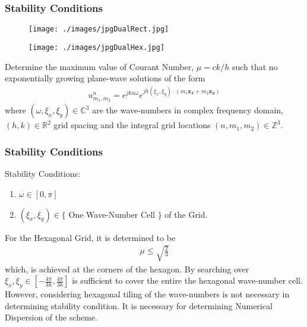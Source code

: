 \documentclass{beamer}
\begin{document}
\begin{frame}
\frametitle{Stability Conditions}
\begin{figure}
\centering
\begin{minipage}{.5\textwidth}
  \centering
\texttt{[image: ./images/jpgDualRect.jpg]}
\label{fig:DualRectGrid}
\end{minipage}%
\begin{minipage}{.5\textwidth}
  \centering
\texttt{[image: ./images/jpgDualHex.jpg]}
\label{fig:DualHexGrid}
\end{minipage}
\end{figure}

Determine the maximum value of Courant Number, $\mu = ck/h$ such that no exponentially growing plane-wave solutions of the form
\begin{align*}
u^{n}_{m_1, m_2} = e^{jk n\omega } e^{jh (\xi_x, \xi_y)\cdot(m_1 \mathbf{x_1}+ m_2 \mathbf{x_2})}
\end{align*}
where $(\omega, \xi_x, \xi_y) \in \mathbb{C}^3$ are the wave-numbers in complex frequency domain, $(h,k) \in  \mathbb{R}^2$ grid spacing and the integral grid locations $(n,m_1,m_2) \in \mathbb{Z}^3$.

\end{frame}

\begin{frame}
\frametitle{Stability Conditions}

Stability Conditions:
\begin{enumerate}
\item $\omega \in [0,\pi]$
\item $(\xi_x, \xi_y) \in \{$ One Wave-Number Cell $\}$ of the Grid. 
\end{enumerate}


For the Hexagonal Grid, it is determined to be 
\begin{align}
\mu \leq \sqrt{\frac{2}{3}}
\end{align}
which, is achieved at the corners of the hexagon. By searching over $ \xi_x, \xi_y \in [-\frac{4\pi}{3h},\frac{4\pi}{3h}]$ is sufficient to cover the entire the hexagonal wave-number cell. 
However, considering hexagonal tiling of the wave-numbers is not necessary in determining stability condition. It is necessary for determining Numerical Dispersion of the scheme.
\end{frame}

\end{document}
